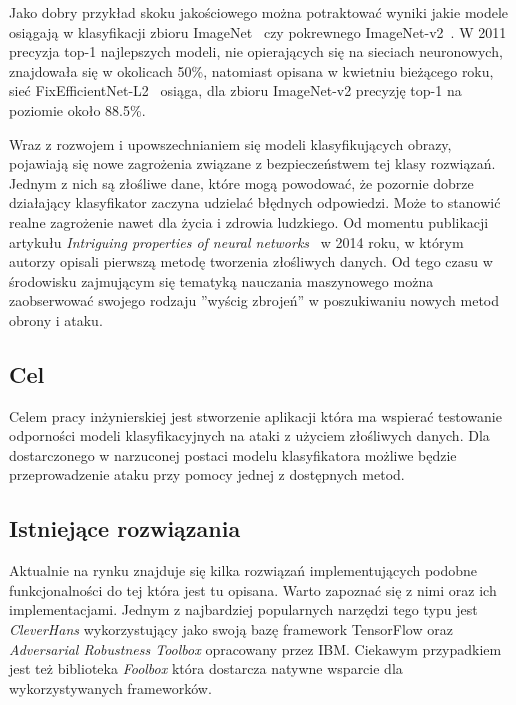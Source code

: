 \documentclass[
    left=2.5cm,         %
    right=2.5cm,        %
    top=2.5cm,          %
    bottom=3cm,         %
    bindingoffset=6mm,  %
    nohyphenation=false %
]{eiti/eiti-thesis}
\begin{document}
Jako dobry przykład skoku jakościowego można potraktować wyniki jakie modele osiągają w klasyfikacji zbioru ImageNet~\cite{ILSVRC15} czy pokrewnego ImageNet-v2~\cite{DBLP:journals/corr/abs-1902-10811}.
W 2011 precyzja top-1 najlepszych modeli, nie opierających się na sieciach neuronowych, znajdowała się w okolicach 50\%, natomiast
opisana w kwietniu bieżącego roku, sieć FixEfficientNet-L2~\cite{Touvron2020FixingTT} osiąga, dla zbioru ImageNet-v2 precyzję top-1 na poziomie około 88.5\%.

Wraz z rozwojem i upowszechnianiem się modeli klasyfikujących obrazy,
pojawiają się nowe zagrożenia związane z bezpieczeństwem tej klasy rozwiązań.
Jednym z nich są złośliwe dane, które mogą powodować,
że pozornie dobrze działający klasyfikator zaczyna udzielać błędnych odpowiedzi.
Może to stanowić realne zagrożenie nawet dla życia i zdrowia ludzkiego.
Od momentu publikacji artykułu \textit{Intriguing properties of neural networks}~\cite{DBLP:journals/corr/SzegedyZSBEGF13} w 2014 roku,
w którym autorzy opisali pierwszą metodę tworzenia złośliwych danych.
Od tego czasu w środowisku zajmującym się tematyką nauczania maszynowego można zaobserwować swojego rodzaju
''wyścig zbrojeń'' w poszukiwaniu nowych metod obrony i ataku.

\subsection{Cel}
\label{sec:target}

Celem pracy inżynierskiej jest stworzenie aplikacji która ma wspierać testowanie
odporności modeli klasyfikacyjnych na ataki z użyciem złośliwych danych.
Dla dostarczonego w narzuconej postaci modelu klasyfikatora możliwe będzie
przeprowadzenie ataku przy pomocy jednej z dostępnych metod.

\subsection{Istniejące rozwiązania}

Aktualnie na rynku znajduje się kilka rozwiązań implementujących podobne funkcjonalności
do tej która jest tu opisana. Warto zapoznać się z nimi oraz ich implementacjami.
Jednym z najbardziej popularnych narzędzi tego typu jest \textit{CleverHans}\cite{DBLP:journals/corr/GoodfellowPM16}
wykorzystujący jako swoją bazę framework TensorFlow oraz \textit{Adversarial Robustness Toolbox}\cite{DBLP:journals/corr/abs-1807-01069} opracowany przez IBM.
Ciekawym przypadkiem jest też biblioteka \textit{Foolbox}\cite{rauber2017foolbox} która dostarcza natywne wsparcie dla wykorzystywanych frameworków.
\end{document}
